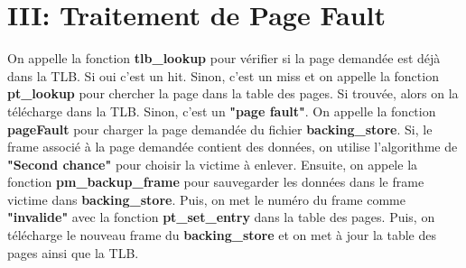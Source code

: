 \documentclass{article}
\begin{document}
\section*{III: Traitement de Page Fault}
On appelle la fonction \textbf{tlb\_lookup} pour vérifier si la page demandée est déjà dans la TLB. Si oui c'est un hit. Sinon, c'est un miss et on appelle la fonction \textbf{pt\_lookup} pour chercher la page dans la table des pages. Si trouvée, alors on la télécharge dans la TLB. Sinon, c'est un \textbf{"page fault"}. On appelle la fonction \textbf{pageFault} pour charger la page demandée du fichier \textbf{backing\_store}. Si, le frame associé à la page demandée contient des données, on utilise l'algorithme de \textbf{"Second chance"} pour choisir la victime à enlever. Ensuite, on appele la fonction \textbf{pm\_backup\_frame} pour sauvegarder les données dans le frame victime dans \textbf{backing\_store}. Puis, on met le numéro du frame comme \textbf{"invalide"} avec la fonction \textbf{pt\_set\_entry} dans la table des pages. Puis, on télécharge le nouveau frame du \textbf{backing\_store} et on met à jour la table des pages ainsi que la TLB.
\end{document}
